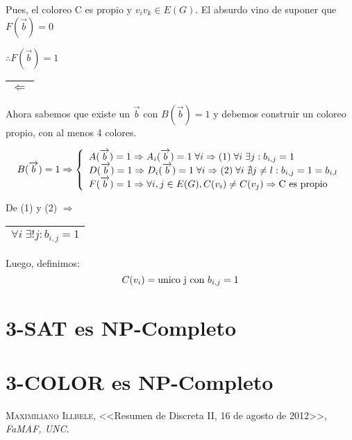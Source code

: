 \documentclass[12pt,a4paper]{report}
\newcounter{neq}
\begin{document}
		Pues, el coloreo C es propio y $v_{i} v_{k} \in E(G)$. El absurdo vino de suponer que $F(\overrightarrow{b}) = 0$
		
		\vspace{3mm}
		$\therefore F(\overrightarrow{b}) = 1$
		
		\vspace{5mm}
		\begin{tabular}{|c|} \hline $\Leftarrow$ \\ \hline \end{tabular}
		
		Ahora sabemos que existe un $\overrightarrow{b}$ con $B(\overrightarrow{b}) = 1$ y debemos construir un coloreo propio, con al menos 4 colores.
		
		\begin{equation*}
			B(\overrightarrow{b}) = 1\Rightarrow
  			\left \lbrace
  			\begin{array}{l}
    		 A(\overrightarrow{b}) = 1 \Rightarrow A_{i}(\overrightarrow{b}) = 1 \; \forall i \Rightarrow  (1) \; \forall i \; \exists j : b_{i, j}  = 1 \\
     		 D(\overrightarrow{b}) = 1 \Rightarrow D_{i}(\overrightarrow{b}) = 1 \; \forall i \Rightarrow  (2) \;  \forall i \; \nexists j \neq l : b_{i, j}  = 1 = b_{i, l} \\
     		 F(\overrightarrow{b}) = 1 \Rightarrow \forall i, j \in E(G), C(v_{i}) \neq C(v_{j}) \Rightarrow \textup{C es propio}
  			\end{array}
  			\right.
		\end{equation*}
		
		De (1) y (2) $\Rightarrow$ \begin{tabular}{|c|} \hline $\forall i \; \exists ! j : b_{i, j} = 1$ \\ \hline \end{tabular}
		
		\vspace{3mm}
		Luego, definimos:
		\[ C(v_{i}) = \textup{unico j con } b_{i, j} = 1\] 
	\section{3-SAT es NP-Completo}

	\section{3-COLOR es NP-Completo}


\begin{thebibliography}{X}
 \textsc{Maximiliano Illbele},
<<Resumen de Discreta II, 16 de agosto de 2012>>,
\textit{FaMAF, UNC}.
\end{thebibliography}
\end{document}
